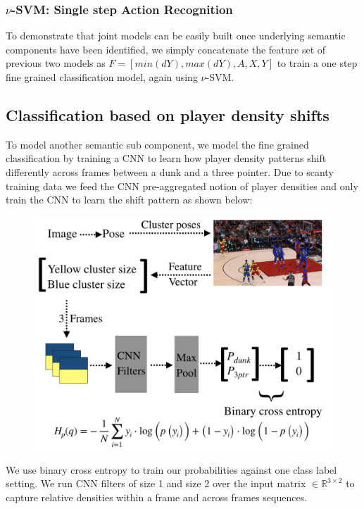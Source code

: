 \documentclass{article}
\begin{document}
\subsubsection{$\nu$-SVM: Single step Action Recognition}
To demonstrate that joint models can be easily built once underlying semantic components have been identified, we simply concatenate the feature set of previous two models as $F=[min(dY), max(dY), A, X, Y]$ to train a one step fine grained classification model, again using $\nu$-SVM.

\subsection{Classification based on player density shifts}
To model another semantic sub component, we model the fine grained classification by training a CNN to learn how player density patterns shift differently across frames between a dunk and a three pointer. Due to scanty training data we feed the CNN pre-aggregated notion of player densities and only train the CNN to learn the shift pattern as shown below:

\begin{figure}[ht]
\vskip -0.05in
\begin{center}
\centerline{\includegraphics[width=\columnwidth]{cnn.png}}
\label{fig:e2e}
\end{center}
\vskip -0.2in
\end{figure}

We use binary cross entropy to train our probabilities against one class label setting. We run CNN filters of size 1 and size 2 over the input matrix $\in \mathbb{R}^{3 \times 2}$ to capture relative densities within a frame and across frames sequences.
\end{document}
